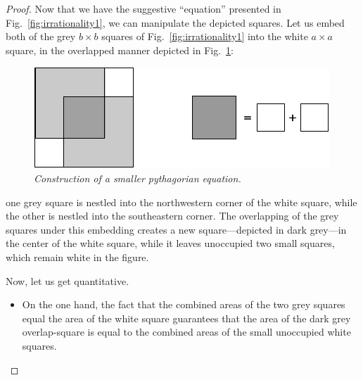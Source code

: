 \begin{proof}
Now that we have the suggestive ``equation'' presented in
Fig.~\ref{fig:irrationality1}, we can manipulate the depicted squares.
Let us embed both of the grey $b \times b$ squares of
Fig.~\ref{fig:irrationality1} into the white $a \times a$ square, in
the overlapped manner depicted in Fig.~\ref{fig:irrationality2}:
\begin{figure}[htb]
\begin{center}
       \includegraphics[scale=0.4]{FiguresArithmetic/sqrt2final}
\caption{{\it Construction of a smaller pythagorian equation.}
\label{fig:irrationality2}}
\end{center}
\end{figure}
one grey square is nestled into the northwestern corner of the white
square, while the other is nestled into the southeastern corner.
The overlapping of the grey squares under this
embedding creates a new square---depicted in dark grey---in the center
of the white square, while it leaves unoccupied two small squares,
which remain white in the figure.

Now, let us get quantitative.
\begin{itemize}
\item
On the one hand, the fact that the combined areas of the two grey
squares equal the area of the white square guarantees that the area of
the dark grey overlap-square is equal to the combined areas of the
small unoccupied white squares.


\end{itemize}
\end{proof}

